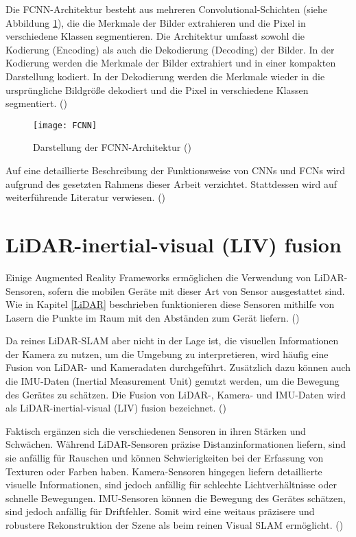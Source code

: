 Die FCNN-Architektur besteht aus mehreren Convolutional-Schichten (siehe Abbildung \ref{fig:FCNN}), die die Merkmale der Bilder extrahieren und die Pixel in verschiedene Klassen segmentieren. Die Architektur umfasst sowohl die Kodierung (Encoding) als auch die Dekodierung (Decoding) der Bilder. In der Kodierung werden die Merkmale der Bilder extrahiert und in einer kompakten Darstellung kodiert. In der Dekodierung werden die Merkmale wieder in die ursprüngliche Bildgröße dekodiert und die Pixel in verschiedene Klassen segmentiert. (\cite{long2014fcnn})

\begin{figure}
    \centering
    \texttt{[image: FCNN]}
    \caption{Darstellung der FCNN-Architektur (\cite{long2014fcnn})\label{fig:FCNN}}\par
\end{figure}

Auf eine detaillierte Beschreibung der Funktionsweise von CNNs und FCNs wird aufgrund des gesetzten Rahmens dieser Arbeit verzichtet. Stattdessen wird auf weiterführende Literatur verwiesen. (\cite{long2014fcnn})

\section{LiDAR-inertial-visual (LIV) fusion}

Einige Augmented Reality Frameworks ermöglichen die Verwendung von LiDAR-Sensoren, sofern die mobilen Geräte mit dieser Art von Sensor ausgestattet sind. Wie in Kapitel \ref{LiDAR} beschrieben funktionieren diese Sensoren mithilfe von Lasern die Punkte im Raum mit den Abständen zum Gerät liefern. (\cite{appledevdoc, arcoredevdoc})

Da reines LiDAR-SLAM aber nicht in der Lage ist, die visuellen Informationen der Kamera zu nutzen, um die Umgebung zu interpretieren, wird häufig eine Fusion von LiDAR- und Kameradaten durchgeführt. Zusätzlich dazu können auch die IMU-Daten (Inertial Measurement Unit) genutzt werden, um die Bewegung des Gerätes zu schätzen. Die Fusion von LiDAR-, Kamera- und IMU-Daten wird als LiDAR-inertial-visual (LIV) fusion bezeichnet. (\cite{zhang2024lidarslam})

Faktisch ergänzen sich die verschiedenen Sensoren in ihren Stärken und Schwächen. Während LiDAR-Sensoren präzise Distanzinformationen liefern, sind sie anfällig für Rauschen und können Schwierigkeiten bei der Erfassung von Texturen oder Farben haben. Kamera-Sensoren hingegen liefern detaillierte visuelle Informationen, sind jedoch anfällig für schlechte Lichtverhältnisse oder schnelle Bewegungen. IMU-Sensoren können die Bewegung des Gerätes schätzen, sind jedoch anfällig für Driftfehler. Somit wird eine weitaus präzisere und robustere Rekonstruktion der Szene als beim reinen Visual SLAM ermöglicht. (\cite{zhang2024lidarslam})

